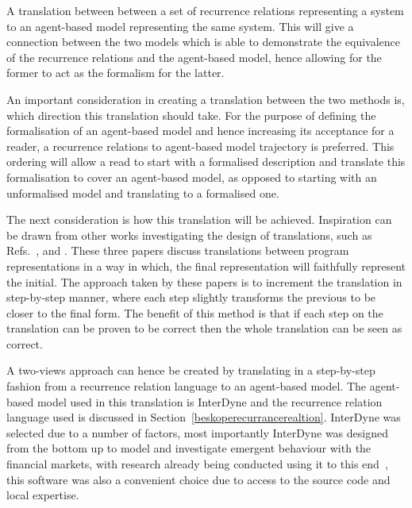 \documentclass{article}
\begin{document}
A translation between between a set of recurrence relations representing a system to an agent-based model representing the same system. This will give a connection between the two models which is able to demonstrate the equivalence of the recurrence relations and the agent-based model, hence allowing for the former to act as the formalism for the latter.   

An important consideration in creating a translation between the two methods is, which direction this translation should take. For the purpose of defining the formalisation of an agent-based model and hence increasing its acceptance for a reader, a recurrence relations to agent-based model trajectory is preferred. This ordering will allow a read to start with a formalised description and translate this formalisation to cover an agent-based model, as opposed to starting with an unformalised model and translating to a formalised one.     

The next consideration is how this translation will be achieved. Inspiration can be drawn from other works investigating the design of translations, such as Refs.~\cite{clovertrans},  \cite{transproggotmod} and  \cite{stepcorentconv}. These three papers discuss translations between program representations in a way in which, the final representation will faithfully represent the initial. The approach taken by these papers is to increment the translation in step-by-step manner, where each step slightly transforms the previous to be closer to the final form. The benefit of this method is that if each step on the translation can be proven to be correct then the whole translation can be seen as correct. 

A two-views approach can hence be created by translating in a step-by-step fashion from a recurrence relation language to an agent-based model. The agent-based model used in this translation is InterDyne and the recurrence relation language used is discussed in Section~\ref{beskoperecurrancerealtion}. InterDyne was selected due to a number of factors, most importantly InterDyne was designed from the bottom up to model and investigate emergent behaviour with the financial markets, with research already being conducted using it to this end~\cite{DynamicCoupling_Chris}, this software was also a convenient choice due to access to the source code and local expertise.
\end{document}
